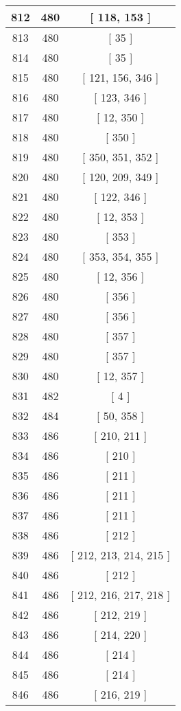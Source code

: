 \begin{center}
\begin{longtable}[H]{|| c c c ||}
812 & 480 & [ 118, 153 ] \\ 
\hline
813 & 480 & [ 35 ] \\ 
\hline
814 & 480 & [ 35 ] \\ 
\hline
815 & 480 & [ 121, 156, 346 ] \\ 
\hline
816 & 480 & [ 123, 346 ] \\ 
\hline
817 & 480 & [ 12, 350 ] \\ 
\hline
818 & 480 & [ 350 ] \\ 
\hline
819 & 480 & [ 350, 351, 352 ] \\ 
\hline
820 & 480 & [ 120, 209, 349 ] \\ 
\hline
821 & 480 & [ 122, 346 ] \\ 
\hline
822 & 480 & [ 12, 353 ] \\ 
\hline
823 & 480 & [ 353 ] \\ 
\hline
824 & 480 & [ 353, 354, 355 ] \\ 
\hline
825 & 480 & [ 12, 356 ] \\ 
\hline
826 & 480 & [ 356 ] \\ 
\hline
827 & 480 & [ 356 ] \\ 
\hline
828 & 480 & [ 357 ] \\ 
\hline
829 & 480 & [ 357 ] \\ 
\hline
830 & 480 & [ 12, 357 ] \\ 
\hline
831 & 482 & [ 4 ] \\ 
\hline
832 & 484 & [ 50, 358 ] \\ 
\hline
833 & 486 & [ 210, 211 ] \\ 
\hline
834 & 486 & [ 210 ] \\ 
\hline
835 & 486 & [ 211 ] \\ 
\hline
836 & 486 & [ 211 ] \\ 
\hline
837 & 486 & [ 211 ] \\ 
\hline
838 & 486 & [ 212 ] \\ 
\hline
839 & 486 & [ 212, 213, 214, 215 ] \\ 
\hline
840 & 486 & [ 212 ] \\ 
\hline
841 & 486 & [ 212, 216, 217, 218 ] \\ 
\hline
842 & 486 & [ 212, 219 ] \\ 
\hline
843 & 486 & [ 214, 220 ] \\ 
\hline
844 & 486 & [ 214 ] \\ 
\hline
845 & 486 & [ 214 ] \\ 
\hline
846 & 486 & [ 216, 219 ] \\ 
\hline

\end{longtable}
\end{center}
